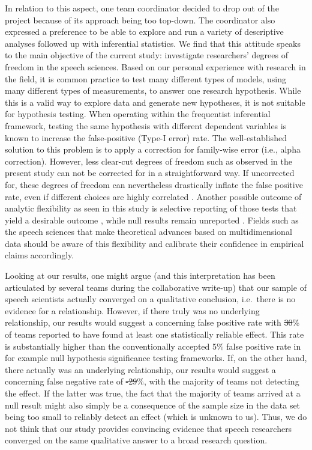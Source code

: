 \documentclass[Review,times,sageh]{sagej}
\providecommand{\DIFaddtex}[1]{{\protect\color{blue}\uwave{#1}}} %
\providecommand{\DIFdeltex}[1]{{\protect\color{red}\sout{#1}}}                      %
\providecommand{\DIFaddbegin}{} %
\providecommand{\DIFaddend}{} %
\providecommand{\DIFdelbegin}{} %
\providecommand{\DIFdelend}{} %
\providecommand{\DIFadd}[1]{\texorpdfstring{\DIFaddtex{#1}}{#1}} %
\providecommand{\DIFdel}[1]{\texorpdfstring{\DIFdeltex{#1}}{}} %
\begin{document}
In relation to this aspect, one team coordinator decided to drop out of the project because of its approach being too top-down.
The coordinator also expressed a preference to be able to explore and run a variety of descriptive analyses followed up with inferential statistics.
We find that this attitude speaks to the main objective of the current study: investigate researchers' degrees of freedom in the speech sciences.
Based on our personal experience with research in the field, it is common practice to test many different types of models, using many different types of measurements, to answer one research hypothesis.
While this is a valid way to explore data and generate new hypotheses, it is not suitable for hypothesis testing.
When operating within the frequentist inferential framework, testing the same hypothesis with different dependent variables is known to increase the false-positive (Type-I error) rate.
The well-established solution to this problem is to apply a correction for family-wise error (i.e., alpha correction).
However, less clear-cut degrees of freedom such as observed in the present study can not be corrected for in a straightforward way.
If uncorrected for, these degrees of freedom can nevertheless drastically inflate the false positive rate, even if different choices are highly correlated \citep{roettger2019researcher}.
Another possible outcome of analytic flexibility as seen in this study is selective reporting of those tests that yield a desirable outcome \citep{kerr1998harking, john2012measuring, simmons2011false}, while null results remain unreported \citep{sterling1959publication, rosenthal1979file}.
Fields such as the speech sciences that make theoretical advances based on multidimensional data should be aware of this flexibility and calibrate their confidence in empirical claims accordingly.

Looking at our results, one might argue (and this interpretation has been articulated by several teams during the collaborative write-up) that our sample of speech scientists actually converged on a qualitative conclusion, i.e.~there is no evidence for a relationship.
However, if there truly was no underlying relationship, our results would suggest a concerning false positive rate with \DIFdelbegin \DIFdel{30}\DIFdelend \DIFaddbegin \DIFadd{39.4}\DIFaddend \% of teams reported to have found at least one statistically reliable effect.
This rate is substantially higher than the conventionally accepted 5\% false positive rate in for example null hypothesis significance testing frameworks.
If, on the other hand, there actually was an underlying relationship, our results would suggest a concerning false negative rate of \DIFdelbegin \DIFdel{-29}\DIFdelend \DIFaddbegin \DIFadd{-38.4}\DIFaddend \%, with the majority of teams not detecting the effect.
If the latter was true, the fact that the majority of teams arrived at a null result might also simply be a consequence of the sample size in the data set being too small to reliably detect an effect (which is unknown to us).
Thus, we do not think that our study provides convincing evidence that speech researchers converged on the same qualitative answer to a broad research question.
\end{document}

